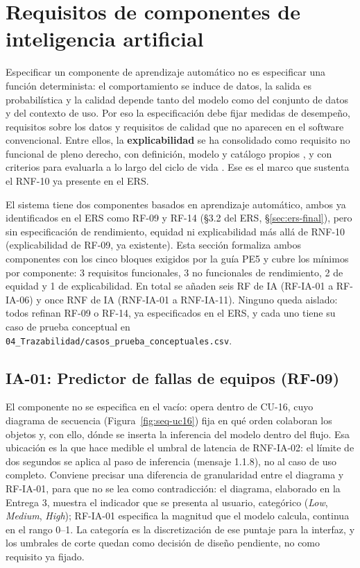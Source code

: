 \section{Requisitos de componentes de inteligencia artificial}

Especificar un componente de aprendizaje autom\'atico no es especificar una funci\'on determinista: el comportamiento se induce de datos, la salida es probabil\'istica y la calidad depende tanto del modelo como del conjunto de datos y del contexto de uso. Por eso la especificaci\'on debe fijar medidas de desempe\~no, requisitos sobre los datos y requisitos de calidad que no aparecen en el software convencional. Entre ellos, la \textbf{explicabilidad} se ha consolidado como requisito no funcional de pleno derecho, con definici\'on, modelo y cat\'alogo propios \cite{chazette2020explainability,chazette2021exploring}, y con criterios para evaluarla a lo largo del ciclo de vida \cite{chazette2022explainable}. Ese es el marco que sustenta el RNF-10 ya presente en el ERS.

El sistema tiene dos componentes basados en aprendizaje autom\'atico, ambos ya identificados en el ERS como RF-09 y RF-14 (\S3.2 del ERS, \S\ref{sec:ers-final}), pero sin especificaci\'on de rendimiento, equidad ni explicabilidad m\'as all\'a de RNF-10 (explicabilidad de RF-09, ya existente). Esta secci\'on formaliza ambos componentes con los cinco bloques exigidos por la gu\'ia PE5 y cubre los m\'inimos por componente: 3 requisitos funcionales, 3 no funcionales de rendimiento, 2 de equidad y 1 de explicabilidad. En total se a\~naden seis RF de IA (RF-IA-01 a RF-IA-06) y once RNF de IA (RNF-IA-01 a RNF-IA-11). Ninguno queda aislado: todos refinan RF-09 o RF-14, ya especificados en el ERS, y cada uno tiene su caso de prueba conceptual en \texttt{04\_Trazabilidad/casos\_prueba\_conceptuales.csv}.

\subsection{IA-01: Predictor de fallas de equipos (RF-09)}


El componente no se especifica en el vac\'io: opera dentro de CU-16, cuyo diagrama de secuencia (Figura~\ref{fig:seq-uc16}) fija en qu\'e orden colaboran los objetos y, con ello, d\'onde se inserta la inferencia del modelo dentro del flujo. Esa ubicaci\'on es la que hace medible el umbral de latencia de RNF-IA-02: el l\'imite de dos segundos se aplica al paso de inferencia (mensaje 1.1.8), no al caso de uso completo. Conviene precisar una diferencia de granularidad entre el diagrama y RF-IA-01, para que no se lea como contradicci\'on: el diagrama, elaborado en la Entrega 3, muestra el indicador que se presenta al usuario, categ\'orico (\emph{Low}, \emph{Medium}, \emph{High}); RF-IA-01 especifica la magnitud que el modelo calcula, continua en el rango 0--1. La categor\'ia es la discretizaci\'on de ese puntaje para la interfaz, y los umbrales de corte quedan como decisi\'on de dise\~no pendiente, no como requisito ya fijado.

